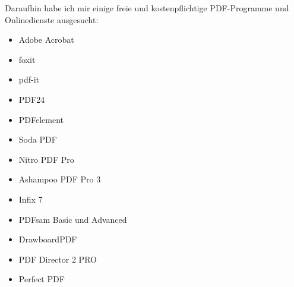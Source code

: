 Daraufhin habe ich mir einige freie und kostenpflichtige PDF-Programme und Onlinedienste ausgesucht: 

\begin{itemize}
	\item Adobe Acrobat
	\item foxit
	\item pdf-it
	\item PDF24
	\item PDFelement
	\item Soda PDF
	\item Nitro PDF Pro 
	\item Ashampoo PDF Pro 3
	\item Infix 7
	\item PDFsam Basic und Advanced
	\item DrawboardPDF
	\item PDF Director 2 PRO
	\item Perfect PDF
\end{itemize}

